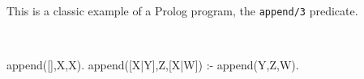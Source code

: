 \documentclass{article}
\begin{document}
\noindent
This is a classic example of a Prolog program, the \texttt{append/3} predicate.

\ \\

%
\def\purlesc{https://ciao-lang.org/playground/\#:-\%20module(\_,\_,\%5B\%5D).\%0A\%0Aappend(\%5B\%5D,X,X).\%0Aappend(\%5BX\%7CY\%5D,Z,\%5BX\%7CW\%5D)\%20:-\%0A\%20\%20\%20\%20\%20append(Y,Z,W).}
%
\begin{prologrunesc}
append([],X,X).
append([X|Y],Z,[X|W]) :-
     append(Y,Z,W).
\end{prologrunesc}
\end{document}
